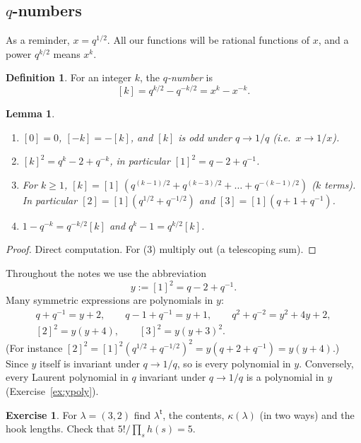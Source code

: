 \documentclass[11pt]{article}
\theoremstyle{plain}
\newtheorem{lemma}[theorem]{Lemma}
\theoremstyle{definition}
\newtheorem{definition}[theorem]{Definition}
\newtheorem{exercise}{Exercise}[section]
\theoremstyle{remark}
\newcommand{\tr}{{\mathsf t}}
\newcommand{\lt}[1]{#1^{\tr}}
\begin{document}
\subsection{\texorpdfstring{$q$}{q}-numbers}

As a reminder, $x=q^{1/2}$. All our functions will be rational functions of $x$, and a power
$q^{k/2}$ means
$x^k$.

\begin{definition}
For an integer $k$, the \textit{$q$-number} is
\begin{equation}\label{eq:qnumber}
[k]=q^{k/2}-q^{-k/2}=x^k-x^{-k}.
\end{equation}
\end{definition}

\begin{lemma}\label{lem:qnumbers}
\begin{enumerate}
\item $[0]=0$, $[-k]=-[k]$, and $[k]$ is odd under $q\rightarrow1/q$ (i.e.\ $x\rightarrow1/x$).
\item $[k]^2=q^k-2+q^{-k}$, in particular $[1]^2=q-2+q^{-1}$.
\item For $k\ge1$, $[k]=[1]\,(q^{(k-1)/2}+q^{(k-3)/2}+\ldots+q^{-(k-1)/2})$ ($k$ terms). In
particular $[2]=[1](q^{1/2}+q^{-1/2})$ and $[3]=[1](q+1+q^{-1})$.
\item $1-q^{-k}=q^{-k/2}[k]$ and $q^k-1=q^{k/2}[k]$.
\end{enumerate}
\end{lemma}
\begin{proof}
Direct computation. For (3) multiply out (a telescoping sum).
\end{proof}

Throughout the notes we use the abbreviation
\begin{equation}\label{eq:y}
y:=[1]^2=q-2+q^{-1}.
\end{equation}
Many symmetric expressions are polynomials in $y$:
\begin{multline}
q+q^{-1}=y+2,\qquad q-1+q^{-1}=y+1,\qquad q^2+q^{-2}=y^2+4y+2,\\
[2]^2=y(y+4),\qquad [3]^2=y(y+3)^2 .
\end{multline}
(For instance $[2]^2=[1]^2(q^{1/2}+q^{-1/2})^2=y(q+2+q^{-1})=y(y+4)$.) Since $y$ itself is
invariant under $q\rightarrow 1/q$, so is every polynomial in $y$. Conversely, every Laurent polynomial in
$q$ invariant under $q\rightarrow1/q$ is a polynomial in $y$ (Exercise~\ref{ex:ypoly}).

\begin{exercise}\label{ex:part1}
For $\lambda=(3,2)$ find $\lt\lambda$, the contents, $\kappa(\lambda)$ (in two ways) and the hook
lengths. Check that $5!/\prod_s h(s)=5$.
\end{exercise}
\end{document}
